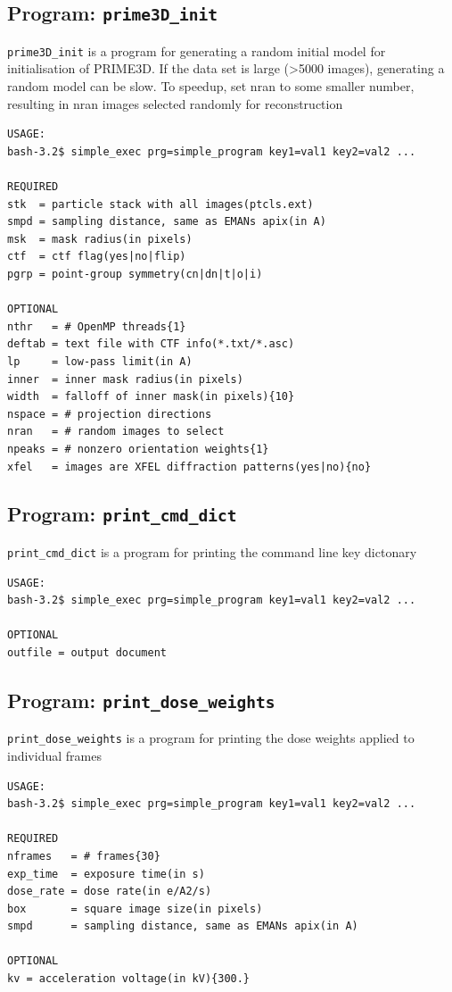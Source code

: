 \documentclass[a4paper,11pt]{article}
\newcommand{\prgname}[1]{\textcolor{NavyBlue}{\texttt{#1}}}
\begin{document}
\subsection{Program: \prgname{prime3D\_init}}
\label{prime3D_init}
\prgname{prime3D\_init} is a program for generating a random initial model for initialisation of PRIME3D. If the data set is large (>5000 images), generating a random model can be slow. To speedup, set nran to some smaller number, resulting in nran images selected randomly for reconstruction

\begin{verbatim}
USAGE:
bash-3.2$ simple_exec prg=simple_program key1=val1 key2=val2 ...

REQUIRED
stk  = particle stack with all images(ptcls.ext)
smpd = sampling distance, same as EMANs apix(in A)
msk  = mask radius(in pixels)
ctf  = ctf flag(yes|no|flip)
pgrp = point-group symmetry(cn|dn|t|o|i)

OPTIONAL
nthr   = # OpenMP threads{1}
deftab = text file with CTF info(*.txt/*.asc)
lp     = low-pass limit(in A)
inner  = inner mask radius(in pixels)
width  = falloff of inner mask(in pixels){10}
nspace = # projection directions
nran   = # random images to select
npeaks = # nonzero orientation weights{1}
xfel   = images are XFEL diffraction patterns(yes|no){no}
\end{verbatim}

\subsection{Program: \prgname{print\_cmd\_dict}}
\label{print_cmd_dict}
\prgname{print\_cmd\_dict} is a program for printing the command line key dictonary

\begin{verbatim}
USAGE:
bash-3.2$ simple_exec prg=simple_program key1=val1 key2=val2 ...

OPTIONAL
outfile = output document
\end{verbatim}

\subsection{Program: \prgname{print\_dose\_weights}}
\label{print_dose_weights}
\prgname{print\_dose\_weights} is a program for printing the dose weights applied to individual frames

\begin{verbatim}
USAGE:
bash-3.2$ simple_exec prg=simple_program key1=val1 key2=val2 ...

REQUIRED
nframes   = # frames{30}
exp_time  = exposure time(in s)
dose_rate = dose rate(in e/A2/s)
box       = square image size(in pixels)
smpd      = sampling distance, same as EMANs apix(in A)

OPTIONAL
kv = acceleration voltage(in kV){300.}
\end{verbatim}
\end{document}
